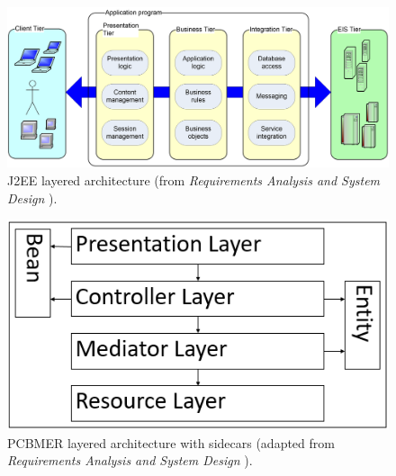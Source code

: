 \documentclass{slide}
\begin{document}


\begin{frame}

\begin{figure}
    \begin{adjustwidth}{-7mm}{-7mm}
        \includegraphics[width=0.96\paperwidth]{images/j2ee-arch.png}
    \end{adjustwidth}
    \caption{J2EE layered architecture (from \textit{Requirements Analysis and System Design} \cite{rasd2007}).}
\end{figure}

\end{frame}


\begin{frame}

\begin{figure}
    \centering
    \includegraphics[width=0.5\paperwidth]{images/pcbmer.png}
    \caption{PCBMER layered architecture with sidecars (adapted from \textit{Requirements Analysis and System Design} \cite{rasd2007}).}
\end{figure}

\end{frame}
\end{document}
